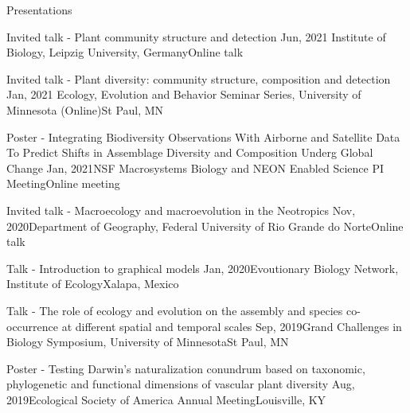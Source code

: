 \documentclass{resume} %
\begin{document}

\begin{rSection}{Presentations}

\begin{sSubsection}{Invited talk - Plant community structure and detection}{ }{Jun, 2021}{ Institute of Biology, Leipzig University, Germany}{Online talk}
\end{sSubsection}

\begin{sSubsection}{Invited talk - Plant diversity: community structure, composition and detection}{ }{Jan, 2021}{ Ecology, Evolution and Behavior Seminar Series, University of Minnesota (Online)}{St Paul, MN}
\end{sSubsection}

\begin{sSubsection}{Poster - Integrating Biodiversity Observations With Airborne and Satellite Data To Predict Shifts in Assemblage Diversity and Composition Underg Global Change}{ }{Jan, 2021}{NSF Macrosystems Biology and NEON Enabled Science PI Meeting}{Online meeting}
\end{sSubsection}

\begin{sSubsection}{Invited talk - Macroecology and macroevolution in the Neotropics}{ }{Nov, 2020}{Department of Geography, Federal University of Rio Grande do Norte}{Online talk}
\end{sSubsection}

\begin{sSubsection}{Talk - Introduction to graphical models}{ }{Jan, 2020}{Evoutionary Biology Network, Institute of Ecology}{Xalapa, Mexico}
\end{sSubsection}

\begin{sSubsection}{Talk - The role of ecology and evolution on the assembly and species co-occurrence at different spatial and temporal scales}{ }{Sep, 2019}{Grand Challenges in Biology Symposium, University of Minnesota}{St Paul, MN}
\end{sSubsection}

\begin{sSubsection}{Poster - Testing Darwin's naturalization conundrum based on taxonomic, phylogenetic and functional dimensions of vascular plant diversity}{ }{Aug, 2019}{Ecological Society of America Annual Meeting}{Louisville, KY}
\end{sSubsection}


\end{rSection}
\end{document}
